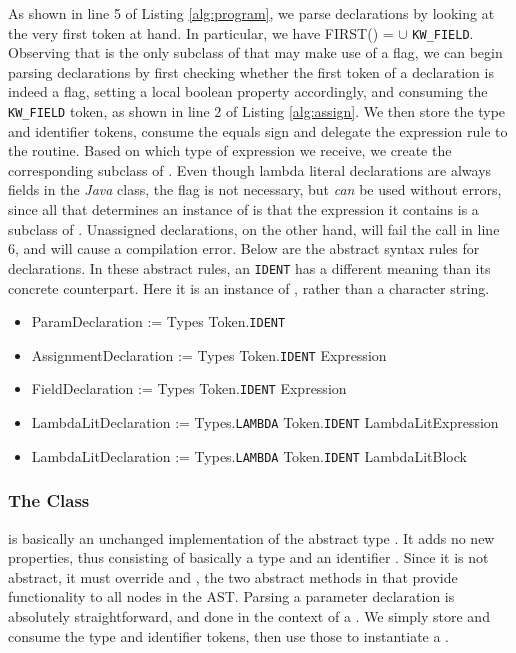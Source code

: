 As shown in line 5 of Listing \ref{alg:program}, we parse declarations by looking at the very first token at hand. In particular, we have FIRST() =  $\cup$ \texttt{KW\_FIELD}. Observing that  is the only subclass of  that may make use of a  flag, we can begin parsing declarations by first checking whether the first token of a declaration is indeed a  flag, setting a local boolean property accordingly, and consuming the \texttt{KW\_FIELD} token, as shown in line 2 of Listing \ref{alg:assign}. We then store the type and identifier tokens, consume the equals sign and delegate the expression rule to the  routine. Based on which type of expression we receive, we create the corresponding subclass of . Even though lambda literal declarations are always fields in the \emph{Java} class, the  flag is not necessary, but \emph{can} be used without errors, since all that determines an instance of  is that the expression it contains is a subclass of . Unassigned declarations, on the other hand, will fail the  call in line 6, and will cause a compilation error. Below are the abstract syntax rules for declarations. In these abstract rules, an \texttt{IDENT} has a different meaning than its concrete counterpart. Here it is an instance of , rather than a character string.

\begin{itemize}
	\item ParamDeclaration := Types Token.\texttt{IDENT}
	\item AssignmentDeclaration := Types Token.\texttt{IDENT} Expression
	\item FieldDeclaration := Types Token.\texttt{IDENT} Expression
	\item LambdaLitDeclaration := Types.\texttt{LAMBDA} Token.\texttt{IDENT} LambdaLitExpression
	\item LambdaLitDeclaration := Types.\texttt{LAMBDA} Token.\texttt{IDENT} LambdaLitBlock
\end{itemize}

\subsubsection{The  Class}

 is basically an unchanged implementation of the abstract type . It adds no new properties, thus consisting of basically a type  and an identifier . Since it is not abstract, it must override  and , the two abstract methods in  that provide functionality to all nodes in the AST. Parsing a parameter declaration is absolutely straightforward, and done in the context of a . We simply store and consume the type and identifier tokens, then use those to instantiate a .

